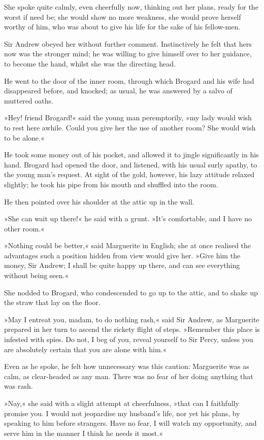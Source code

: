 She spoke quite calmly, even cheerfully now, thinking out her plans, ready for the worst if need be; she would show no more weakness, she would prove herself worthy of him, who was about to give his life for the sake of his fellow-men.

Sir Andrew obeyed her without further comment. Instinctively he felt that hers now was the stronger mind; he was willing to give himself over to her guidance, to become the hand, whilst she was the directing head.

He went to the door of the inner room, through which Brogard and his wife had disappeared before, and knocked; as usual, he was answered by a salvo of muttered oaths.

»Hey! friend Brogard!« said the young man peremptorily, »my lady would wish to rest here awhile. Could you give her the use of another room? She would wish to be alone.«

He took some money out of his pocket, and allowed it to jingle significantly in his hand. Brogard had opened the door, and listened, with his usual surly apathy, to the young man's request. At sight of the gold, however, his lazy attitude relaxed slightly; he took his pipe from his mouth and shuffled into the room.

He then pointed over his shoulder at the attic up in the wall.

»She can wait up there!« he said with a grunt. »It's comfortable, and I have no other room.«

»Nothing could be better,« said Marguerite in English; she at once realised the advantages such a position hidden from view would give her. »Give him the money, Sir Andrew; I shall be quite happy up there, and can see everything without being seen.«

She nodded to Brogard, who condescended to go up to the attic, and to shake up the straw that lay on the floor.

»May I entreat you, madam, to do nothing rash,« said Sir Andrew, as Marguerite prepared in her turn to ascend the rickety flight of steps. »Remember this place is infested with spies. Do not, I beg of you, reveal yourself to Sir Percy, unless you are absolutely certain that you are alone with him.«

Even as he spoke, he felt how unnecessary was this caution: Marguerite was as calm, as clear-headed as any man. There was no fear of her doing anything that was rash.

»Nay,« she said with a slight attempt at cheerfulness, »that can I faithfully promise you. I would not jeopardise my husband's life, nor yet his plans, by speaking to him before strangers. Have no fear, I will watch my opportunity, and serve him in the manner I think he needs it most.«

